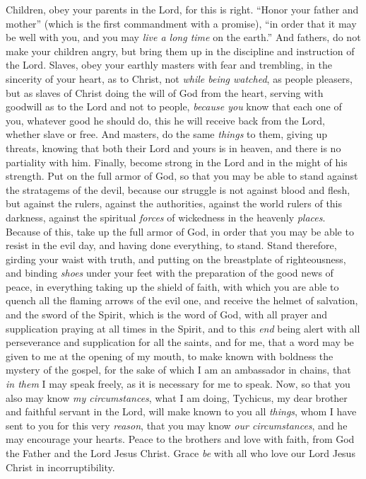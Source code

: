 \begin{biblechapter} %
 Children, obey your parents in the Lord, for this is right.
\verse “Honor your father and mother” (which is the first commandment with a promise),
\verse “in order that it may be well with you, and you may \textit{live a long time} on the earth.”
\verse And fathers, do not make your children angry, but bring them up in the discipline and instruction of the Lord.
 Slaves, obey your earthly masters with fear and trembling, in the sincerity of your heart, as to Christ,
\verse not \textit{while being watched}, as people pleasers, but as slaves of Christ doing the will of God from the heart,
\verse serving with goodwill as to the Lord and not to people,
\verse \textit{because you} know that each one of you, whatever good he should do, this he will receive back from the Lord, whether slave or free.
\verse And masters, do the same \textit{things} to them, giving up threats, knowing that both their Lord and yours is in heaven, and there is no partiality with him.
 Finally, become strong in the Lord and in the might of his strength.
\verse Put on the full armor of God, so that you may be able to stand against the stratagems of the devil,
\verse because our struggle is not against blood and flesh, but against the rulers, against the authorities, against the world rulers of this darkness, against the spiritual \textit{forces} of wickedness in the heavenly \textit{places}.
\verse Because of this, take up the full armor of God, in order that you may be able to resist in the evil day, and having done everything, to stand.
\verse Stand therefore, girding your waist with truth, and putting on the breastplate of righteousness,
\verse and binding \textit{shoes} under your feet with the preparation of the good news of peace,
\verse in everything taking up the shield of faith, with which you are able to quench all the flaming arrows of the evil one,
\verse and receive the helmet of salvation, and the sword of the Spirit, which is the word of God,
\verse with all prayer and supplication praying at all times in the Spirit, and to this \textit{end} being alert with all perseverance and supplication for all the saints,
\verse and for me, that a word may be given to me at the opening of my mouth, to make known with boldness the mystery of the gospel,
\verse for the sake of which I am an ambassador in chains, that \textit{in them} I may speak freely, as it is necessary for me to speak.
 Now, so that you also may know \textit{my circumstances}, what I am doing, Tychicus, my dear brother and faithful servant in the Lord, will make known to you all \textit{things},
\verse whom I have sent to you for this very \textit{reason}, that you may know \textit{our circumstances}, and he may encourage your hearts.
\verse Peace to the brothers and love with faith, from God the Father and the Lord Jesus Christ.
\verse Grace \textit{be} with all who love our Lord Jesus Christ in incorruptibility.
\end{biblechapter}

